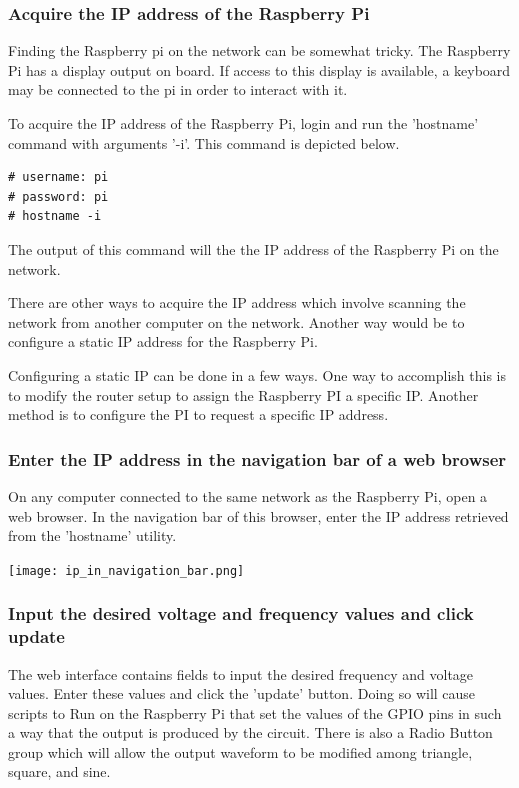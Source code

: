 \documentclass{article}	%
\begin{document}
\begin{multicols}{2}
\subsubsection{Acquire the IP address of the Raspberry Pi}
Finding the Raspberry pi on the network can be somewhat tricky.
The Raspberry Pi has a display output on board.
If access to this display is available,
a keyboard may be connected to the pi in order to
interact with it.

To acquire the IP address of the Raspberry Pi,
login and run the 'hostname' command with arguments '-i'.
This command is depicted below.
\begin{lstlisting}
# username: pi
# password: pi
# hostname -i
\end{lstlisting}
The output of this command will the the IP address of
the Raspberry Pi on the network.

There are other ways to acquire the IP address
which involve scanning the network from
another computer on the network.
Another way would be to configure a static IP address
for the Raspberry Pi.

Configuring a static IP can be done in a few ways.
One way to accomplish this is
to modify the router setup to assign the Raspberry PI a specific IP.
Another method is to configure the PI to request a specific IP address.

\subsubsection{Enter the IP address in the navigation bar of a web browser}
On any computer connected to the same network as the Raspberry Pi,
open a web browser.
In the navigation bar of this browser,
enter the IP address retrieved from the 'hostname' utility.

\begin{center}
\texttt{[image: ip\_in\_navigation\_bar.png]}
\end{center}

\subsubsection{Input the desired voltage and frequency values and click update}
The web interface contains fields to input the desired frequency and voltage values.
Enter these values and click the 'update' button.
Doing so will cause scripts to Run on the Raspberry Pi that
set the values of the GPIO pins in such a way that the output is produced
by the circuit.
There is also a Radio Button group which will allow the 
output waveform to be modified among triangle, square, and sine.


\end{multicols}
\end{document}
